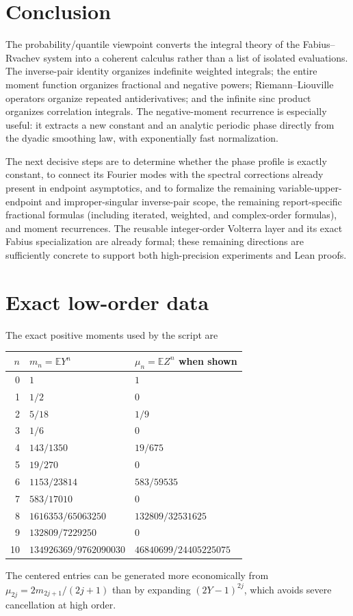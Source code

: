 \documentclass[11pt,oneside]{article}
\theoremstyle{definition}
\theoremstyle{remark}
\newcommand{\E}{\mathbb E}
\newcommand{\1}{\mathbf 1}
\begin{document}
\section{Conclusion}

The probability/quantile viewpoint converts the integral theory of the Fabius--Rvachev
system into a coherent calculus rather than a list of isolated evaluations.  The
inverse-pair identity organizes indefinite weighted integrals; the entire moment function
organizes fractional and negative powers; Riemann--Liouville operators organize repeated
antiderivatives; and the infinite sinc product organizes correlation integrals.  The
negative-moment recurrence is especially useful: it extracts a new constant and an
analytic periodic phase directly from the dyadic smoothing law, with exponentially fast
normalization.

The next decisive steps are to determine whether the phase profile is exactly constant,
to connect its Fourier modes with the spectral corrections already present in endpoint
asymptotics, and to formalize the remaining variable-upper-endpoint and improper-singular
inverse-pair scope, the remaining report-specific fractional formulas (including iterated,
weighted, and complex-order formulas), and moment recurrences.
The reusable integer-order Volterra layer and its exact Fabius specialization are already
formal; these remaining directions are sufficiently concrete to support both
high-precision experiments and Lean proofs.

\appendix

\section{Exact low-order data}

The exact positive moments used by the script are
\begin{longtable}{@{}rll@{}}
\toprule
\(n\)&\(m_n=\E Y^n\)&\(\mu_n=\E Z^n\) when shown\\
\midrule
0&\(1\)&\(1\)\\
1&\(1/2\)&\(0\)\\
2&\(5/18\)&\(1/9\)\\
3&\(1/6\)&\(0\)\\
4&\(143/1350\)&\(19/675\)\\
5&\(19/270\)&\(0\)\\
6&\(1153/23814\)&\(583/59535\)\\
7&\(583/17010\)&\(0\)\\
8&\(1616353/65063250\)&\(132809/32531625\)\\
9&\(132809/7229250\)&\(0\)\\
10&\(134926369/9762090030\)&\(46840699/24405225075\)\\
\bottomrule
\end{longtable}
The centered entries can be generated more economically from
\(\mu_{2j}=2m_{2j+1}/(2j+1)\) than by expanding \((2Y-1)^{2j}\), which avoids severe
cancellation at high order.
\end{document}
